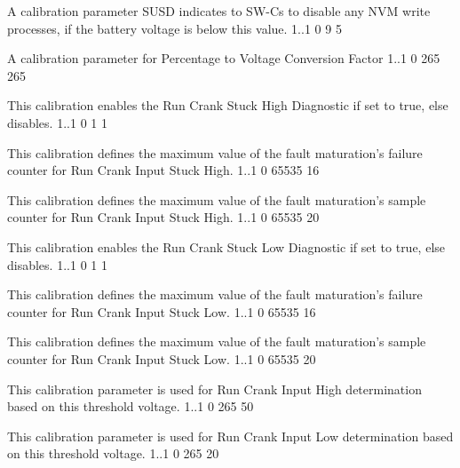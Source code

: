 {
{A calibration parameter SUSD indicates to SW-Cs to disable any NVM write processes, if the battery voltage is below this value.}
{1..1}
{0}
{9}
{5}}
{ }

{
{A calibration parameter for Percentage to Voltage Conversion Factor}
{1..1}
{0}
{265}
{265}}
{}

{
{This calibration enables the Run Crank Stuck High Diagnostic if set to true, else disables.}
{1..1}
{0}
{1}
{1}}
{}

{
{This calibration defines the maximum value of the fault maturation’s failure counter for Run Crank Input Stuck High.}
{1..1}
{0}
{65535}
{16}}
{}

{
{This calibration defines the maximum value of the fault maturation’s sample counter for Run Crank Input Stuck High.}
{1..1}
{0}
{65535}
{20}}
{}

{
{This calibration enables the Run Crank Stuck Low Diagnostic if set to true, else disables.}
{1..1}
{0}
{1}
{1}}
{}

{
{This calibration defines the maximum value of the fault maturation’s failure counter for Run Crank Input Stuck Low.}
{1..1}
{0}
{65535}
{16}}
{}

{
{This calibration defines the maximum value of the fault maturation’s sample counter for Run Crank Input Stuck Low.}
{1..1}
{0}
{65535}
{20}}
{}

{
{This calibration parameter is used for Run Crank Input High determination based on this threshold voltage.}
{1..1}
{0}
{265}
{50}}
{}

{
{This calibration parameter is used for Run Crank Input Low determination based on this threshold voltage.}
{1..1}
{0}
{265}
{20}}
{}

